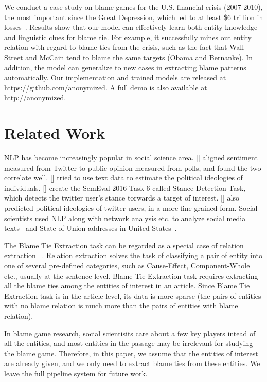 \documentclass[letterpaper]{article} %
\begin{document}
We conduct a case study on blame games for the U.S. financial crisis (2007-2010), the most important since the Great Depression, which led to at least \$6 trillion in losses~\cite{luttrell2013assessing}. Results show that our model can effectively learn both entity knowledge and linguistic clues for blame tie. For example, it successfully mines out entity relation with regard to blame ties from the crisis, such as the fact that Wall Street and McCain tend to blame the same targets (Obama and Bernanke). In addition, the model can generalize to new cases in extracting blame patterns automatically. Our implementation and trained models are released at https://github.com/anonymized. A full demo is also available at http://anonymized.

\section{Related Work}
\label{task}

NLP has become increasingly popular in social science area. \citeauthor{o2010tweets} [\citeyear{o2010tweets}] aligned sentiment measured from Twitter to public opinion measured from polls, and found the two correlate well. \citeauthor{bamman2015open} [\citeyear{bamman2015open}] tried to use text data to estimate the political ideologies of individuals. \citeauthor{mohammad-EtAl:2016:SemEval} [\citeyear{mohammad-EtAl:2016:SemEval}] create the SemEval 2016 Task 6 called Stance Detection Task, which detects the twitter user's stance torwards a target of interest. \citeauthor{preoctiuc2017beyond} [\citeyear{preoctiuc2017beyond}] also predicted political ideologies of twitter users, in a more fine-grained form. Social scientists used NLP along with network analysis etc. to analyze social media texts~\cite{rule2015lexical} and State of Union addresses in United States~\cite{bail2016combining}.

The Blame Tie Extraction task can be regarded as a special case of relation extraction ~\cite{miwa2016end}. Relation extraction solves the task of classifying a pair of entity into one of several pre-defined categories, such as Cause-Effect, Component-Whole etc., usually at the sentence level. Blame Tie Extraction task requires extracting all the blame ties among the entities of interest in an article. Since Blame Tie Extraction task is in the article level, its data is more sparse (the pairs of entities with no blame relation is much more than the pairs of entities with blame relation).

In blame game research, social scientisits care about a few key players intead of all the entities, and most entities in the passage may be irrelevant for studying the blame game. Therefore, in this paper, we assume that the entities of interest are already given, and we only need to extract blame ties from these entities. We leave the full pipeline system for future work.
\end{document}

